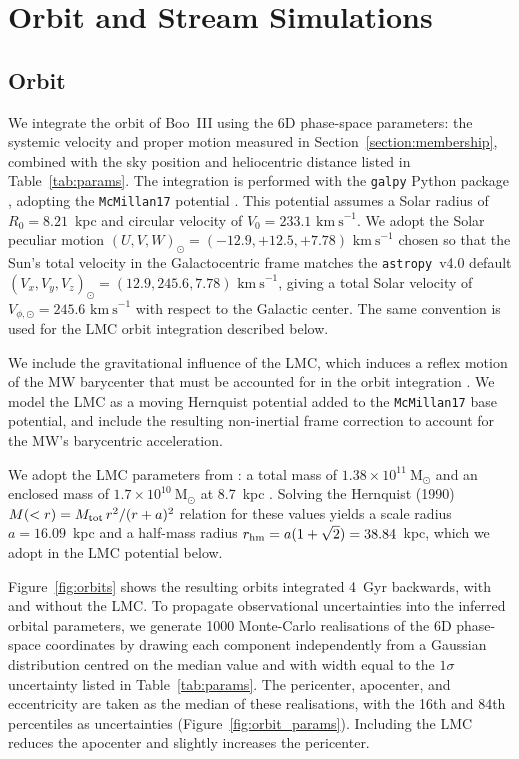 \documentclass[twocolumn, apj, numberedappendix, appendixfloats]{openjournal_dhayaa}
\newcommand{\vlosUnits}{$\mathrm{km~s}^{-1}$\xspace}
\begin{document}
\section{Orbit and Stream Simulations} 

\subsection{Orbit} \label{section:orbit}
We integrate the orbit of Boo~III using the 6D phase-space parameters: the systemic velocity and proper motion measured in Section~\ref{section:membership}, combined with the sky position and heliocentric distance listed in Table~\ref{tab:params}. The integration is performed with the \texttt{galpy} Python package \citep{Bovy2015}, adopting the \texttt{McMillan17} potential \citep{McMillan2017}. This potential assumes a Solar radius of $R_0 = 8.21$~kpc and circular velocity of $V_0 = 233.1$ \vlosUnits. We adopt the Solar peculiar motion $(U,V,W)_\odot = (-12.9, +12.5, +7.78)$ \vlosUnits chosen so that the Sun's total velocity in the Galactocentric frame matches the \texttt{astropy}~v4.0 default $(V_x, V_y, V_z)_\odot = (12.9, 245.6, 7.78)$ \vlosUnits \citep{Drimmel2018}, giving a total Solar velocity of $V_{\phi,\odot} = 245.6$ \vlosUnits with respect to the Galactic center. The same convention is used for the LMC orbit integration described below.

We include the gravitational influence of the LMC, which induces a reflex motion of the MW barycenter that must be accounted for in the orbit integration \citep{Erkal2019, Petersen2021}. We model the LMC as a moving Hernquist potential \citep{Hernquist1990} added to the \texttt{McMillan17} base potential, and include the resulting non-inertial frame correction to account for the MW's barycentric acceleration.

We adopt the LMC parameters from \citet{Pace2022}: a total mass of $1.38 \times 10^{11}~\mathrm{M}_\odot$ and an enclosed mass of $1.7 \times 10^{10}~\mathrm{M}_\odot$ at 8.7~kpc \citep{vanderMarel2014}.  Solving the Hernquist (1990) $M(<r) = M_{\rm tot}\,r^2/(r+a)^2$ relation for these values yields a scale radius $a = 16.09$~kpc and a half-mass radius $r_{\rm hm} = a(1+\sqrt{2}) = 38.84$~kpc, which we adopt in the LMC potential below.

Figure~\ref{fig:orbits} shows the resulting orbits integrated 4~Gyr backwards, with and without the LMC. To propagate observational uncertainties into the inferred orbital parameters, we generate 1000 Monte-Carlo realisations of the 6D phase-space coordinates by drawing each component independently from a Gaussian distribution centred on the median value and with width equal to the $1\sigma$ uncertainty listed in Table~\ref{tab:params}. The pericenter, apocenter, and eccentricity are taken as the median of these realisations, with the 16th and 84th percentiles as uncertainties (Figure~\ref{fig:orbit_params}). Including the LMC reduces the apocenter and slightly increases the pericenter.
\end{document}
